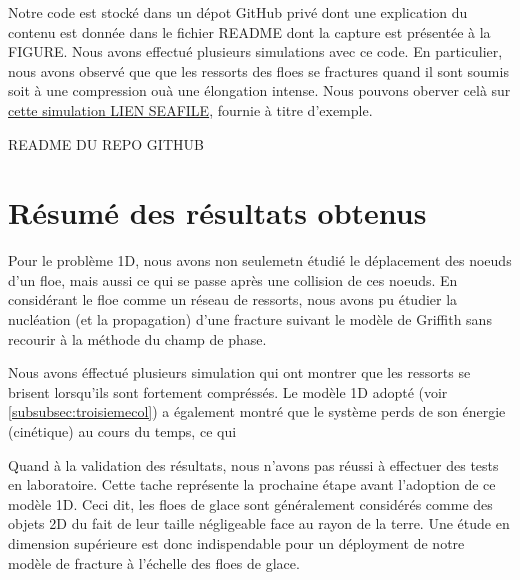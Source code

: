 Notre code est stocké dans un dépot GitHub privé dont une explication du contenu est donnée dans le fichier README dont la capture est présentée à la FIGURE. Nous avons effectué plusieurs simulations avec ce code. En particulier, nous avons observé que que les ressorts des floes se fractures quand il sont soumis soit à une compression ouà une élongation intense. Nous pouvons oberver celà sur \href{www}{cette simulation LIEN SEAFILE}, fournie à titre d'exemple.  

README DU REPO GITHUB





\section{Résumé des résultats obtenus}


Pour le problème 1D, nous avons non seulemetn étudié le déplacement des noeuds d'un floe, mais aussi ce qui se passe après une collision de ces noeuds. En considérant le floe comme un réseau de ressorts, nous avons pu étudier la nucléation (et la propagation) d'une fracture suivant le modèle de Griffith sans recourir à la méthode du champ de phase.

Nous avons éffectué plusieurs simulation qui ont montrer que les ressorts se brisent lorsqu'ils sont fortement compréssés. Le modèle 1D adopté (voir \cref{subsubsec:troisiemecol}) a également montré que le système perds de son énergie (cinétique) au cours du temps, ce qui 

Quand à la validation des résultats, nous n'avons pas réussi à effectuer des tests en laboratoire. Cette tache représente la prochaine étape avant l'adoption de ce modèle 1D. Ceci dit, les floes de glace sont généralement considérés comme des objets 2D du fait de leur taille négligeable face au rayon de la terre. Une étude en dimension supérieure est donc indispendable pour un déployment de notre modèle de fracture à l'échelle des floes de glace.










